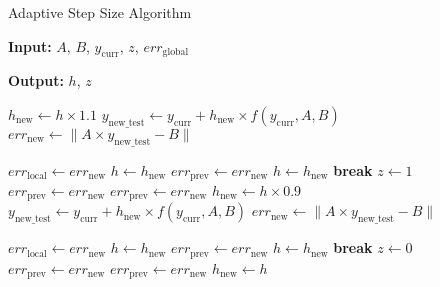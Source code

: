 \documentclass[11pt]{article}
\begin{document}
\begin{algorithm}[H]
\caption{Adaptive Step Size Algorithm}
\begin{algorithmic}
\State \textbf{Input:}  $A$, $B$, $y_{\text{curr}}$,  $z$,  $err_{\text{global}}$

\State \textbf{Output:} $h$, $z$

         
            \State $h_{\text{new}} \gets h \times 1.1$
            \State $y_{\text{new\_test}} \gets y_{\text{curr}} + h_{\text{new}} \times f(y_{\text{curr}}, A, B)$
            \State $err_{\text{new}} \gets \|A \times y_{\text{new\_test}} - B\|$
            
                \State $err_{\text{local}} \gets err_{\text{new}}$
                \State $h \gets h_{\text{new}}$
                \State $err_{\text{prev}} \gets err_{\text{new}}$
                \State $h \gets h_{\text{new}}$
                \State \textbf{break}
                \State $z \gets 1$
                \State $err_{\text{prev}} \gets err_{\text{new}}$
            \Else
                \State $err_{\text{prev}} \gets err_{\text{new}}$
            \EndIf
        \Else {}
            \State $h_{\text{new}} \gets h \times 0.9$
            \State $y_{\text{new\_test}} \gets y_{\text{curr}} + h_{\text{new}} \times f(y_{\text{curr}}, A, B)$
            \State $err_{\text{new}} \gets \|A \times y_{\text{new\_test}} - B\|$
            
                \State $err_{\text{local}} \gets err_{\text{new}}$
                \State $h \gets h_{\text{new}}$
                \State $err_{\text{prev}} \gets err_{\text{new}}$
                \State $h \gets h_{\text{new}}$
                \State \textbf{break}
                \State $z \gets 0$
                \State $err_{\text{prev}} \gets err_{\text{new}}$
            \Else
                \State $err_{\text{prev}} \gets err_{\text{new}}$
            \EndIf
        \EndIf
    \EndWhile
    \State $h_{\text{new}} \gets h$
\end{algorithmic}
\end{algorithm}
\end{document}
